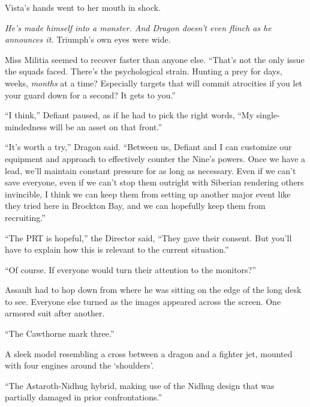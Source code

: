Vista's hands went to her mouth in shock.



\emph{He's made himself into a monster.  And Dragon doesn't even flinch as he announces it. }Triumph's own eyes were wide.



Miss Militia seemed to recover faster than anyone else.  ``That's not the only issue the squads faced.  There's the psychological strain.  Hunting a prey for days, weeks, \emph{months} at a time?  Especially targets that will commit atrocities if you let your guard down for a second?  It gets to you.''



``I think,'' Defiant paused, as if he had to pick the right words, ``My single-mindedness will be an asset on that front.''



``It's worth a try,'' Dragon said.  ``Between us, Defiant and I can customize our equipment and approach to effectively counter the Nine's powers.  Once we have a lead, we'll maintain constant pressure for as long as necessary.  Even if we can't save everyone, even if we can't stop them outright with Siberian rendering others invincible, I think we can keep them from setting up another major event like they tried here in Brockton Bay, and we can hopefully keep them from recruiting.''



``The PRT is hopeful,'' the Director said, ``They gave their consent.  But you'll have to explain how this is relevant to the current situation.''



``Of course.  If everyone would turn their attention to the monitors?''



Assault had to hop down from where he was sitting on the edge of the long desk to see.  Everyone else turned as the images appeared across the screen.  One armored suit after another.



``The Cawthorne mark three.''



A sleek model resembling a cross between a dragon and a fighter jet, mounted with four engines around the `shoulders'.



``The Astaroth-Nidhug hybrid, making use of the Nidhug design that was partially damaged in prior confrontations.''



